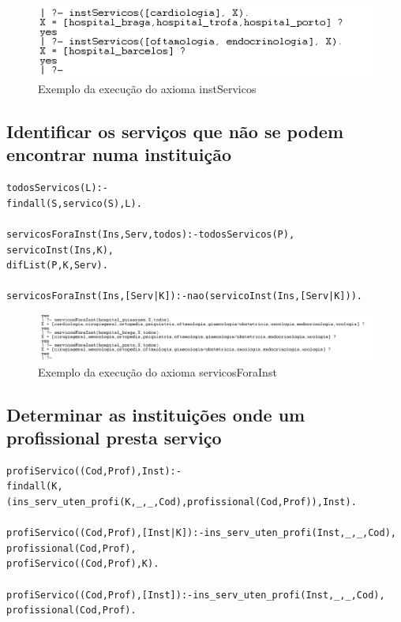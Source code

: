 \begin{figure}[<+htpb+>]
	\centering
	\includegraphics[scale=0.9]{answer5.png}
	\caption{Exemplo da execução do axioma instServicos}
	\label{p3:fig:output5}
\end{figure}

\subsection{Identificar os serviços que não se podem encontrar numa instituição}

\begin{verbatim}
todosServicos(L):-
findall(S,servico(S),L).

servicosForaInst(Ins,Serv,todos):-todosServicos(P), 
servicoInst(Ins,K),
difList(P,K,Serv).

servicosForaInst(Ins,[Serv|K]):-nao(servicoInst(Ins,[Serv|K])).
\end{verbatim}


\begin{figure}[<+htpb+>]
	\centering
	\includegraphics[scale=0.6]{answer6.png}
	\caption{Exemplo da execução do axioma servicosForaInst}
	\label{p3:fig:output6}
\end{figure}

\subsection{Determinar as instituições onde um profissional presta serviço }
\begin{verbatim}
profiServico((Cod,Prof),Inst):- 
findall(K,(ins_serv_uten_profi(K,_,_,Cod),profissional(Cod,Prof)),Inst).

profiServico((Cod,Prof),[Inst|K]):-ins_serv_uten_profi(Inst,_,_,Cod),
profissional(Cod,Prof),
profiServico((Cod,Prof),K).

profiServico((Cod,Prof),[Inst]):-ins_serv_uten_profi(Inst,_,_,Cod),
profissional(Cod,Prof).
\end{verbatim}

